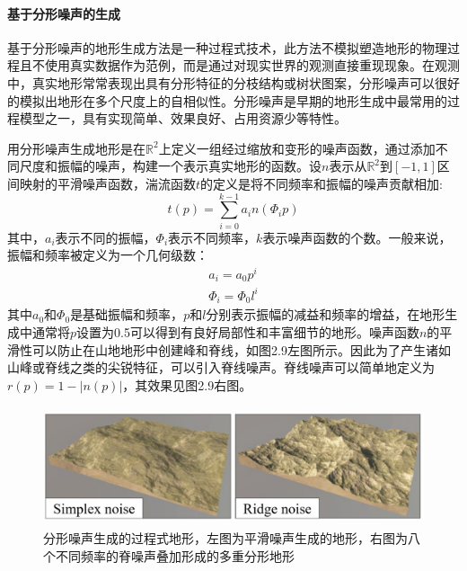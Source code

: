 \paragraph{基于分形噪声的生成}
基于分形噪声的地形生成方法是一种过程式技术，此方法不模拟塑造地形的物理过程且不使用真实数据作为范例，而是通过对现实世界的观测直接重现现象。在观测中，真实地形常常表现出具有分形特征的分枝结构或树状图案，分形噪声可以很好的模拟出地形在多个尺度上的自相似性。分形噪声是早期的地形生成中最常用的过程模型之一，具有实现简单、效果良好、占用资源少等特性。\par
用分形噪声生成地形是在$\mathbb{R}^2$上定义一组经过缩放和变形的噪声函数\supercite{fbm}，通过添加不同尺度和振幅的噪声，构建一个表示真实地形的函数。设$n$表示从$\mathbb{R}^2$到$[−1,1]$区间映射的平滑噪声函数，湍流函数$t$的定义是将不同频率和振幅的噪声贡献相加:
\begin{equation}
t(p)=\sum_{i=0}^{k-1}a_in(\Phi_ip)
\end{equation}
其中，$a_i$表示不同的振幅，$\Phi_i$表示不同频率，$k$表示噪声函数的个数。一般来说，振幅和频率被定义为一个几何级数：
\begin{equation}
\begin{aligned}
a_i=a_0p^i \\
\Phi_i=\Phi_0l^i
\end{aligned}
\end{equation}
其中$a_0$和$\Phi_0$是基础振幅和频率，$p$和$l$分别表示振幅的减益和频率的增益，在地形生成中通常将$p$设置为0.5可以得到有良好局部性和丰富细节的地形。噪声函数$n$的平滑性可以防止在山地地形中创建峰和脊线，如图2.9左图所示。因此为了产生诸如山峰或脊线之类的尖锐特征，可以引入脊线噪声。脊线噪声可以简单地定义为$r(p) = 1-|n(p)|$，其效果见图2.9右图。
\begin{figure}[htbp]
\centering
\includegraphics[height=3.5cm,width=11.4cm]{figures/fractal.JPG}
\caption{分形噪声生成的过程式地形，左图为平滑噪声生成的地形，右图为八个不同频率的脊噪声叠加形成的多重分形地形\supercite{eric-review}}
\end{figure}
